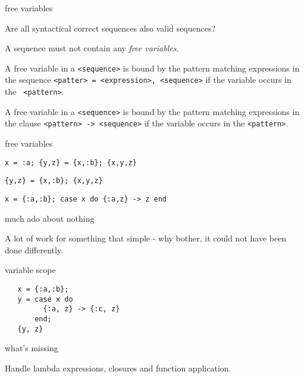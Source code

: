 \begin{frame}{free variables}

Are all syntactical correct sequences also valid sequences?

\pause\vspace{20pt}

A sequence must not contain any {\em free variables}.

\pause\vspace{10pt}

A free variable in a {\tt <sequence>} is bound by the
pattern matching expressions in the sequence {\tt <patter> =
<expression>, <sequence>} if the variable occurs in the {\tt
<pattern>}.

\pause\vspace{10pt}

A free variable in a {\tt <sequence>} is bound by the pattern matching
expressions in the clause {\tt <pattern> -> <sequence>} if the
variable occurs in the {\tt <pattern>}.


\end{frame}

\begin{frame}{free variables}

{\tt x = :a; \{y,z\} = \{x,:b\}; \{x,y,z\}}

\pause\vspace{20pt}

{\tt \{y,z\} = \{x,:b\}; \{x,y,z\}}

\pause\vspace{20pt}

{\tt x = \{:a,:b\}; case x do \{:a,z\} -> z end}

\end{frame}

\begin{frame}{much ado about nothing}

A lot of work for something that simple - why bother, it could not have
been done differently.
\end{frame}


\begin{frame}[fragile]{variable scope}

\vspace{20pt}

\hspace{20pt}
\begin{verbatim}
   x = {:a,:b};
   y = case x do
         {:a, z} -> {:c, z}
       end;
   {y, z}
\end{verbatim}


\end{frame}
 
\begin{frame}{what's missing}

\vspace{20pt}\hspace{20pt} Handle lambda expressions, closures and function application.
  
\end{frame}





